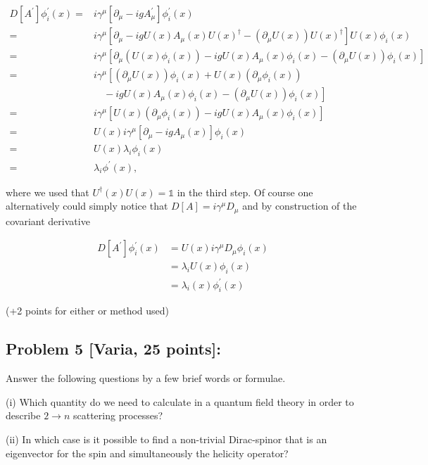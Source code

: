 \documentclass[10pt, letterpaper]{article}
\begin{document}
$$
\begin{aligned}
D\left[A^{\prime}\right] \phi_i^{\prime}(x)= & i \gamma^\mu\left[\partial_\mu-i g A_\mu^{\prime}\right] \phi_i^{\prime}(x) \\
= & i \gamma^\mu\left[\partial_\mu-i g U(x) A_\mu(x) U(x)^{\dagger}-\left(\partial_\mu U(x)\right) U(x)^{\dagger}\right] U(x) \phi_i(x) \\
= & i \gamma^\mu\left[\partial_\mu\left(U(x) \phi_i(x)\right)-i g U(x) A_\mu(x) \phi_i(x)-\left(\partial_\mu U(x)\right) \phi_i(x)\right] \\
= & i \gamma^\mu\left[\left(\partial_\mu U(x)\right) \phi_i(x)+U(x)\left(\partial_\mu \phi_i(x)\right)\right. \\
& \left.\quad-i g U(x) A_\mu(x) \phi_i(x)-\left(\partial_\mu U(x)\right) \phi_i(x)\right] \\
= & i \gamma^\mu\left[U(x)\left(\partial_\mu \phi_i(x)\right)-i g U(x) A_\mu(x) \phi_i(x)\right] \\
= & U(x) i \gamma^\mu\left[\partial_\mu-i g A_\mu(x)\right] \phi_i(x) \\
= & U(x) \lambda_i \phi_i(x) \\
= & \lambda_i \phi^{\prime}(x),
\end{aligned}
$$

where we used that $U^{\dagger}(x) U(x)=\mathbb{1}$ in the third step.
Of course one alternatively could simply notice that $D[A]=i \gamma^\mu D_\mu$ and by construction of the covariant derivative

$$
\begin{aligned}
D\left[A^{\prime}\right] \phi_i^{\prime}(x) & =U(x) i \gamma^\mu D_\mu \phi_i(x) \\
& =\lambda_i U(x) \phi_i(x) \\
& =\lambda_i(x) \phi_i^{\prime}(x)
\end{aligned}
$$

(+2 points for either or method used)


\subsection{Problem 5 [Varia, 25 points]:}

Answer the following questions by a few brief words or formulae.

(i) Which quantity do we need to calculate in a quantum field theory in order to describe $2 \rightarrow n$ scattering processes?

(ii) In which case is it possible to find a non-trivial Dirac-spinor that is an eigenvector for the spin and simultaneously the helicity operator?
\end{document}

